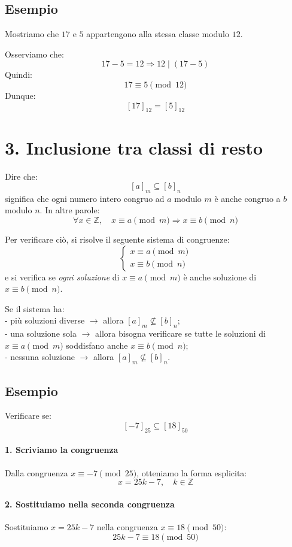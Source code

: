 \documentclass[a4paper,12pt]{article}
\begin{document}
\subsection*{Esempio}
Mostriamo che \(17\) e \(5\) appartengono alla stessa classe modulo \(12\).

Osserviamo che:
\[
17 - 5 = 12 \Rightarrow 12 \mid (17 - 5)
\]
Quindi:
\[
17 \equiv 5 \pmod{12}
\]
Dunque:
\[
[17]_{12} = [5]_{12}
\]

\section*{3. Inclusione tra classi di resto}

Dire che:
\[
[a]_m \subseteq [b]_n
\]
significa che ogni numero intero congruo ad \(a\) modulo \(m\) è anche congruo a \(b\) modulo \(n\). In altre parole:
\[
\forall x \in \mathbb{Z},\quad x \equiv a \pmod{m} \Rightarrow x \equiv b \pmod{n}
\]

Per verificare ciò, si risolve il seguente sistema di congruenze:
\[
\begin{cases}
x \equiv a \pmod{m} \\
x \equiv b \pmod{n}
\end{cases}
\]
e si verifica se \emph{ogni soluzione} di \(x \equiv a \pmod{m}\) è anche soluzione di \(x \equiv b \pmod{n}\).

Se il sistema ha: \\
- più soluzioni diverse $\to$ allora \([a]_m \not\subseteq [b]_n\); \\
- una soluzione sola $\to$ allora bisogna verificare se tutte le soluzioni di \(x \equiv a \pmod{m}\) soddisfano anche \(x \equiv b \pmod{n}\); \\
- nessuna soluzione $\to$ allora \([a]_m \not\subseteq [b]_n\). \\

\subsection*{Esempio}
Verificare se:
\[
[-7]_{25} \subseteq [18]_{50}
\]

\paragraph{1. Scriviamo la congruenza}  
Dalla congruenza \(x \equiv -7 \pmod{25}\), otteniamo la forma esplicita:
\[
x = 25k - 7, \quad k \in \mathbb{Z}
\]

\paragraph{2. Sostituiamo nella seconda congruenza}  
Sostituiamo \(x = 25k - 7\) nella congruenza \(x \equiv 18 \pmod{50}\):
\[
25k - 7 \equiv 18 \pmod{50}
\]
\end{document}

